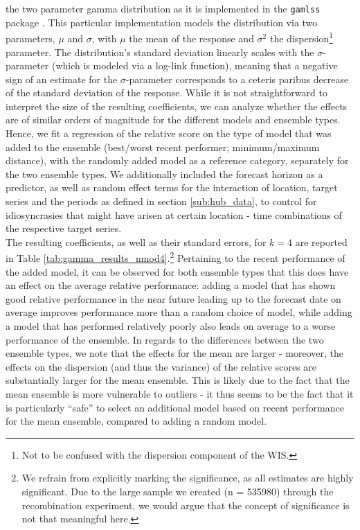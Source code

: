 the two parameter gamma distribution as it is implemented in the \texttt{gamlss} package \citep{rigby_generalized_2005}. This particular implementation models the distribution via two parameters, $\mu$ and $\sigma$, with $\mu$ the mean of the response and $\sigma^2$ the dispersion\footnote{Not to be confused with the dispersion component of the WIS.} parameter. The distribution's standard deviation linearly scales with the $\sigma$-parameter (which is modeled via a log-link function), meaning that a negative sign of an estimate for the $\sigma$-parameter corresponds to a ceteris paribus decrease of the standard deviation of the response. While it is not straightforward to interpret the size of the resulting coefficients, we can analyze whether the effects are of similar orders of magnitude for the different models and ensemble types.\\
Hence, we fit a regression of the relative score on the type of model that was added to the ensemble (best/worst recent performer; minimum/maximum distance), with the randomly added model as a reference category, separately for the two ensemble types. We additionally included the forecast horizon as a predictor, as well as random effect terms for the interaction of location, target series and the periods as defined in section \ref{sub:hub_data}, to control for idiosyncrasies that might have arisen at certain location - time combinations of the respective target series.
\\
The resulting coefficients, as well as their standard errors, for $k = 4$ are reported in Table \ref{tab:gamma_results_nmod4}.\footnote{We refrain from explicitly marking the significance, as all estimates are highly significant. Due to the large sample we created (n = 535980) through the recombination experiment, we would argue that the concept of significance is not that meaningful here.} Pertaining to the recent performance of the added model, it can be observed for both ensemble types that this does have an effect on the average relative performance: adding a model that has shown good relative performance in the near future leading up to the forecast date on average improves performance more than a random choice of model, while adding a model that has performed relatively poorly also leads on average to a worse performance of the ensemble. In regards to the differences between the two ensemble types, we note that the effects for the mean are larger - moreover, the effects on the dispersion (and thus the variance) of the relative scores are substantially larger for the mean ensemble. This is likely due to the fact that the mean ensemble is more vulnerable to outliers - it thus seems to be the fact that it is particularly ``safe'' to select an additional model based on recent performance for the mean ensemble, compared to adding a random model. \\%
